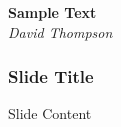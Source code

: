 \documentclass{beamer}
\title{\thetitle}
\newcommand{\textcolour}{mygrey}
\newcommand{\thetitle}{Sample Text}
\begin{document}

\begin{frame}
  \begin{center}
    {\huge \textcolor{myred}{\textbf{\thetitle}} } \\
    \bigskip
    \textcolor{\textcolour}{\emph{David Thompson}}
  \end{center}
\end{frame}


\begin{frame}
\frametitle{Slide Title}
Slide Content
\end{frame}
\end{document}
